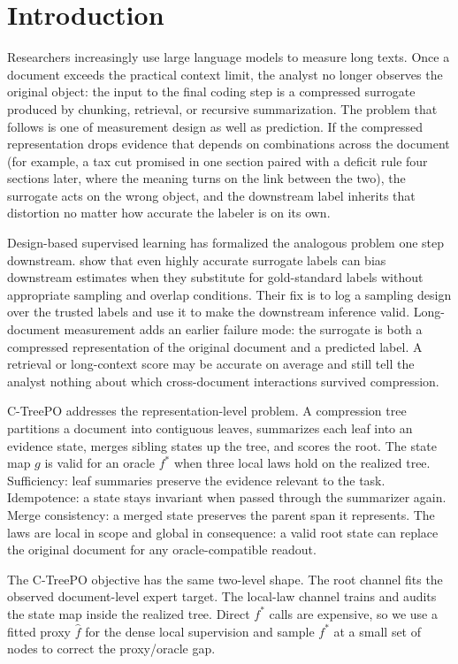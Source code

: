 \section{Introduction}\label{sec:v8-introduction}

Researchers increasingly use large language models to measure long
texts. Once a document exceeds the practical context limit, the
analyst no longer observes the original object: the input to the
final coding step is a compressed surrogate produced by chunking,
retrieval, or recursive summarization. The problem that follows is
one of measurement design as well as prediction. If the compressed
representation drops evidence that depends on combinations across
the document (for example, a tax cut promised in one section paired
with a deficit rule four sections later, where the meaning turns on
the link between the two), the surrogate acts on the wrong object,
and the downstream label inherits that distortion no matter how
accurate the labeler is on its own.

Design-based supervised learning has formalized the analogous
problem one step downstream. \citet{EgamiEtAl2024} show that even
highly accurate surrogate labels can bias downstream estimates when
they substitute for gold-standard labels without appropriate
sampling and overlap conditions. Their fix is to log a sampling
design over the trusted labels and use it to make the downstream
inference valid. Long-document measurement adds an earlier failure
mode: the surrogate is both a compressed representation of the
original document and a predicted label. A retrieval or
long-context score may be accurate on average and still tell the
analyst nothing about which cross-document interactions survived
compression.

C-TreePO addresses the representation-level problem. A compression
tree partitions a document into contiguous leaves, summarizes each
leaf into an evidence state, merges sibling states up the tree, and
scores the root. The state map \(g\) is valid for an oracle
\(f^\ast\) when three local laws hold on the realized tree.
Sufficiency: leaf summaries preserve the evidence relevant to the
task. Idempotence: a state stays invariant when passed through the
summarizer again. Merge consistency: a merged state preserves the
parent span it represents. The laws are local in scope and global
in consequence: a valid root state can replace the original document
for any oracle-compatible readout.

The C-TreePO objective has the same two-level shape. The root
channel fits the observed document-level expert target. The
local-law channel trains and audits the state map inside the
realized tree. Direct \(f^\ast\) calls are expensive, so we use a
fitted proxy \(\widehat f\) for the dense local supervision and
sample \(f^\ast\) at a small set of nodes to correct the
proxy/oracle gap.

